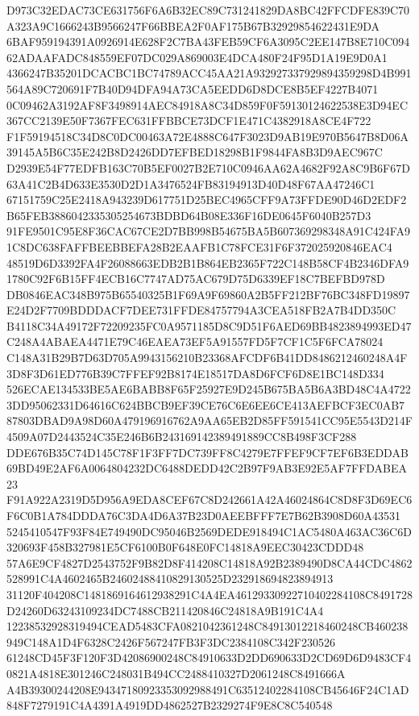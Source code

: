 \documentclass[UTF8,fontset=fandol,zihao=-4,a4paper]{ctexart}
\begin{document}
{{D973C32EDAC73CE631756F6A6B32EC89C731241829DA8BC42FFCDFE839C70A323A9C1666243B9566247F66BBEA2F0AF175B67B32929854622431E9DA
6BAF959194391A0926914E628F2C7BA43FEB59CF6A3095C2EE147B8E710C09462ADAAFADC848559EF07DC029A869003E4DCA480F24F95D1A19E9D0A1
4366247B35201DCACBC1BC74789ACC45AA21A932927337929894359298D4B991564A89C720691F7B40D94DFA94A73CA5EEDD6D8DCE8B5EF4227B4071
0C09462A3192AF8F3498914AEC84918A8C34D859F0F59130124622538E3D94EC367CC2139E50F7367FEC631FFBBCE73DCF1E471C4382918A8CE4F722
F1F59194518C34D8C0DC00463A72E4888C647F3023D9AB19E970B5647B8D06A39145A5B6C35E242B8D2426DD7EFBED18298B1F9844FA8B3D9AEC967C
D2939E54F77EDFB163C70B5EF0027B2E710C0946AA62A4682F92A8C9B6F67D63A41C2B4D633E3530D2D1A3476524FB83194913D40D48F67AA47246C1
67151759C25E2418A943239D617751D25BEC4965CFF9A73FFDE90D46D2EDF2B65FEB3886042335305254673BDBD64B08E336F16DE0645F6040B257D3
91FE9501C95E8F36CAC67CE2D7BB998B54675BA5B607369298348A91C424FA91C8DC638FAFFBEEBBEFA28B2EAAFB1C78FCE31F6F372025920846EAC4
48519D6D3392FA4F26088663EDB2B1B864EB2365F722C148B58CF4B2346DFA91780C92F6B15FF4ECB16C7747AD75AC679D75D6339EF18C7BEFBD978D
DB0846EAC348B975B65540325B1F69A9F69860A2B5FF212BF76BC348FD19897E24D2F7709BDDDACF7DEE731FFDE84757794A3CEA518FB2A7B4DD350C
B4118C34A49172F72209235FC0A9571185D8C9D51F6AED69BB4823894993ED47C248A4ABAEA4471E79C46EAEA73EF5A91557FD5F7CF1C5F6FCA78024
C148A31B29B7D63D705A9943156210B23368AFCDF6B41DD8486212460248A4F3D8F3D61ED776B39C7FFEF92B8174E18517DA8D6FCF6D8E1BC148D334
526ECAE134533BE5AE6BABB8F65F25927E9D245B675BA5B6A3BD48C4A47223DD95062331D64616C624BBCB9EF39CE76C6E6EE6CE413AEFBCF3EC0AB7
87803DBAD9A98D60A479196916762A9AA65EB2D85FF591541CC95E5543D214F4509A07D2443524C35E246B6B243169142389491889CC8B498F3CF288
DDE676B35C74D145C78F1F3FF7DC739FF8C4279E7FFEF9CF7EF6B3EDDAB69BD49E2AF6A0064804232DC6488DEDD42C2B97F9AB3E92E5AF7FFDABEA23
F91A922A2319D5D956A9EDA8CEF67C8D242661A42A46024864C8D8F3D69EC6F6C0B1A784DDDA76C3DA4D6A37B23D0AEEBFFF7E7B62B3908D60A43531
5245410547F93F84E749490DC95046B2569DEDE918494C1AC5480A463AC36C6D320693F458B327981E5CF6100B0F648E0FC14818A9EEC30423CDDD48
57A6E9CF4827D2543752F9B82D8F414208C14818A92B2389490D8CA44CDC4862528991C4A4602465B24602488410829130525D232918694823894913
31120F404208C1481869164612938291C4A4EA46129330922710402284108C8491728D24260D63243109234DC7488CB211420846C24818A9B191C4A4
12238532928319494CEAD5483CFA0821042361248C84913012218460248CB460238949C148A1D4F6328C2426F567247FB3F3DC2384108C342F230526
61248CD45F3F120F3D42086900248C84910633D2DD690633D2CD69D6D9483CF40821A4818E301246C248031B494CC2488410327D2061248C8491666A
A4B39300244208E94347180923353092988491C63512402284108CB45646F24C1AD848F7279191C4A4391A4919DD4862527B2329274F9E8C8C540548
}}
\end{document}
